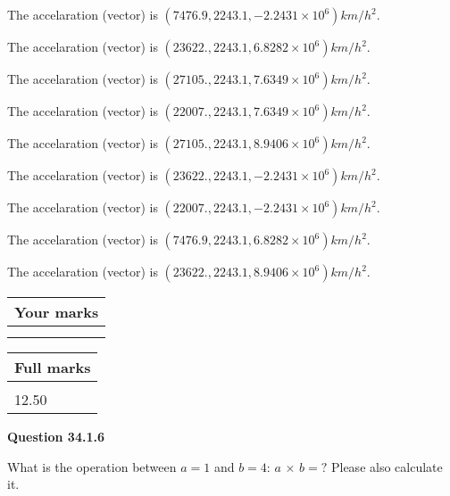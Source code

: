 \documentclass[12pt]{article}
\begin{document}
 
The accelaration (vector) is
$(
7476.9,
2243.1 ,
-2.2431 \times 10^{6}
)km/h^2.
$
 
 
The accelaration (vector) is
$(
23622.,
2243.1 ,
6.8282 \times 10^{6}
)km/h^2.
$
 
 
The accelaration (vector) is
$(
27105.,
2243.1 ,
7.6349 \times 10^{6}
)km/h^2.
$
 
 
The accelaration (vector) is
$(
22007.,
2243.1 ,
7.6349 \times 10^{6}
)km/h^2.
$
 
 
The accelaration (vector) is
$(
27105.,
2243.1 ,
8.9406 \times 10^{6}
)km/h^2.
$
 
 
The accelaration (vector) is
$(
23622.,
2243.1 ,
-2.2431 \times 10^{6}
)km/h^2.
$
 
 
The accelaration (vector) is
$(
22007.,
2243.1 ,
-2.2431 \times 10^{6}
)km/h^2.
$
 
 
The accelaration (vector) is
$(
7476.9,
2243.1 ,
6.8282 \times 10^{6}
)km/h^2.
$
 
 
The accelaration (vector) is
$(
23622.,
2243.1 ,
8.9406 \times 10^{6}
)km/h^2.
$
 
 
 
 

 
 
\vspace{0.3in}
  
\vspace{0.2in}
  
         \begin{tabular}{|l|}
\hline
 Your marks  \\
\hline
 \\ 
 \\ 
\hline
\end{tabular}
\hspace{0.05in} \begin{tabular}{|l|}
\hline
 Full marks  \\
\hline
 \\ 
12.50 \\
\hline
\end{tabular}
{\textbf{\Large{Question
34.1.6 
}}}
  
  
What is the operation between $a= %
1$ and $b= %
4$:
$a$  %
$\times$ $b=?$ Please also calculate it.
\end{document}
